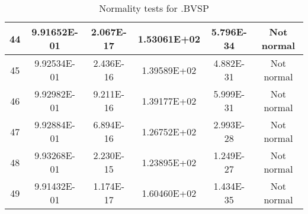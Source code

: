 \begin{table}[h]
\begin{tabular}{|c|c|c|c|c|c|}
		44 & 9.91652E-01 & 2.067E-17 & 1.53061E+02 & 5.796E-34 & Not normal\\\hline
		45 & 9.92534E-01 & 2.436E-16 & 1.39589E+02 & 4.882E-31 & Not normal\\\hline
		46 & 9.92982E-01 & 9.211E-16 & 1.39177E+02 & 5.999E-31 & Not normal\\\hline
		47 & 9.92884E-01 & 6.894E-16 & 1.26752E+02 & 2.993E-28 & Not normal\\\hline
		48 & 9.93268E-01 & 2.230E-15 & 1.23895E+02 & 1.249E-27 & Not normal\\\hline
		49 & 9.91432E-01 & 1.174E-17 & 1.60460E+02 & 1.434E-35 & Not normal\\\hline
	\end{tabular}
	\caption{Normality tests for .BVSP}
\end{table}
